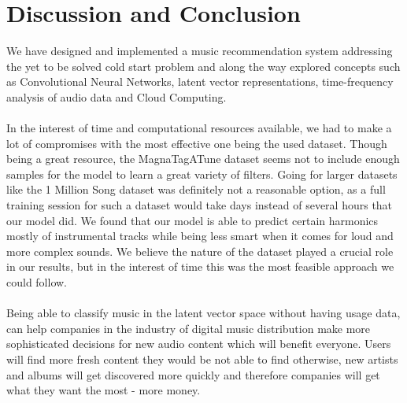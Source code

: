 \documentclass[11pt, a4paper]{article}
\begin{document}
  \section{Discussion and Conclusion}
    We have designed and implemented a music recommendation system addressing
    the yet to be solved cold start problem and along the way explored concepts
    such as Convolutional Neural Networks, latent vector representations,
    time-frequency analysis of audio data and Cloud Computing.
    \\ \\
    \noindent
    In the interest of time and computational resources available, we had to
    make a lot of compromises with the most effective one being the used
    dataset. Though being a great resource, the MagnaTagATune dataset seems not
    to include enough samples for the model to learn a great variety of
    filters. Going for larger datasets like the 1 Million Song dataset was
    definitely not a reasonable option, as a full training session for such a
    dataset would take days instead of several hours that our model did. We
    found that our model is able to predict certain harmonics mostly of
    instrumental tracks while being less smart when it comes for loud and more
    complex sounds. We believe the nature of the dataset played a crucial role
    in our results, but in the interest of time this was the most feasible
    approach we could follow.
    \\ \\
    \noindent
    Being able to classify music in the latent vector space without having
    usage data, can help companies in the industry of digital music
    distribution make more sophisticated decisions for new audio content which
    will benefit everyone. Users will find more fresh content they would be not
    able to find otherwise, new artists and albums will get discovered more
    quickly and therefore companies will get what they want the most - more
    money.
\end{document}
